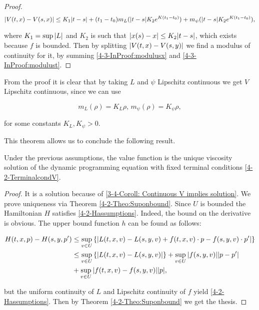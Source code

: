 \begin{theorem}
\begin{proof}
        \begin{equation}\label{4-3-InProof:modulusx}
            \abs{V(t,x)-V(s,x)} \leq K_1\abs{t-s} + (t_1-t_0)m_L(\abs{t-s}K_2e^{K(t_1-t_0)}) + m_{\psi}(\abs{t-s}K_2e^{K(t_1-t_0)}),
        \end{equation}

        where $K_1=\sup\abs{L}$ and $K_2$ is such that $\abs{x(s)-x}\leq K_2\abs{t-s}$, which exists because $f$ is bounded. Then by splitting 
        $\abs{V(t,x)-V(s,y)}$ we find a modulus of continuity for it, by summing \ref{4-3-InProof:modulusx} and \ref{4-3-InProof:modulust}. 
    \end{proof}
\end{theorem}

From the proof it is clear that by taking $L$ and $\psi$ Lipschitz continuous we get $V$ Lipschitz continuous, since we can use 

\[m_L(\rho)=K_L\rho,\, m_{\psi}(\rho)=K_{\psi}\rho,\]

for some constants $K_L,K_{\psi}>0$. 

This theorem allows us to conclude the following result.

\begin{corollary} 
    Under the previous assumptions, the value function is the unique viscosity solution of the dynamic programming equation with fixed terminal conditions \ref{4-2-TerminalcondV}. 

    \begin{proof} 
        It is a solution because of \ref{3-4-Coroll: Continuous V implies solution}. We prove uniqueness via Theorem \ref{4-2-Theo:Suponbound}. 
        Since $U$ is bounded the Hamiltonian $H$ satisfies \ref{4-2-Hassumptions}. Indeed, the bound on the derivative is obvious. 
        The upper bound function $h$ can be found as follows:

        \begin{align*}
            H(t,x,p) - H(s,y,p') & \leq \sup_{v\in U}\left\{\abs{L(t,x,v)-L(s,y,v) + f(t,x,v)\cdot p - f(s,y,v)\cdot p'}\right\} \\
            & \leq \sup_{v\in U}\left\{\abs{L(t,x,v)-L(s,y,v)}\right\} + \sup_{v\in U}\abs{f(s,y,v)}\abs{p-p'} \\
            & + \sup_{v\in U}\abs{f(t,x,v)-f(s,y,v)}\abs{p},
        \end{align*}

        but the uniform continuity of $L$ and Lipschitz continuity of $f$ yield \ref{4-2-Hassumptions}. Then by Theorem \ref{4-2-Theo:Suponbound} we get the thesis.
    \end{proof} 
\end{corollary}

